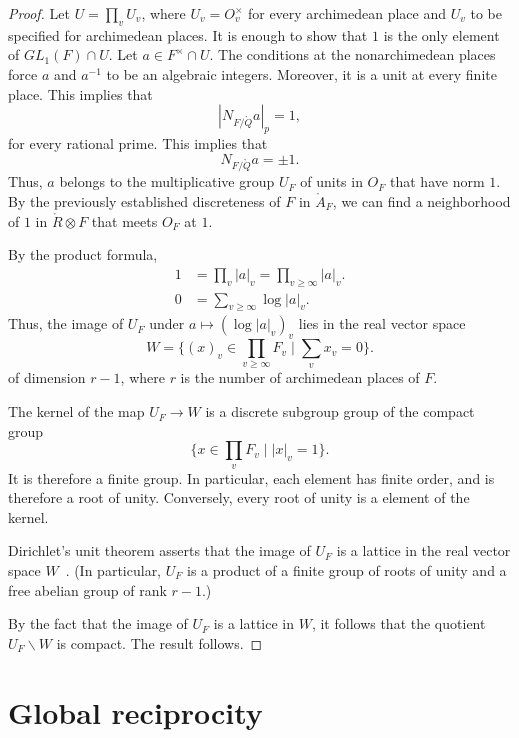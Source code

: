 \documentclass{amsart}
\def\abs#1{{|#1|}}
\def\RR{\ring{R}}
\def\AA{\ring{A}}
\begin{document}
\begin{proof} Let $U = \prod_v U_v$, where $U_v = O_v^\times$ for
  every archimedean place and $U_v$ to be specified for archimedean
  places.  It is enough to show that $1$ is the only element of
  $GL_1(F)\cap U$.  Let $a\in F^\times \cap U$.  The conditions at the
  nonarchimedean places force $a$ and $a^{-1}$ to be an algebraic integers.
  Moreover, it is a unit at every finite place.  
This implies that
\[
|N_{F/\ring{Q}} a|_p = 1,
\]
for every rational prime.  This implies that
\[
N_{F/\ring{Q}} a = \pm 1.
\]
Thus, $a$ belongs to the multiplicative group $U_F$ of units in $O_F$
that have norm $1$.  By the previously established discreteness of $F$
in $\AA_F$, we can find a neighborhood of $1$  in $\RR\otimes F$ that
meets $O_F$ at $1$.  

By the product formula,
\begin{align*}
1 &= \prod_v \abs{a}_v = \prod_{v\ge\infty} \abs{a}_v.\\
0 &= \sum_{v\ge\infty} \log \abs{a}_v.
\end{align*}
Thus, the image of $U_F$ under $a \mapsto (\log\abs{a}_v)_v$ 
lies in the real vector space
\[
W = \{ (x)_v \in \prod_{v\ge\infty} F_v \mid \sum_v x_v = 0\}.
\]
of dimension $r-1$, where $r$ is the number of archimedean places of $F$.

The kernel of the map $U_F\to W$ is a discrete subgroup group of 
the compact group 
\[
\{x\in \prod_v F_v \mid |x|_v=1\}.
\]
It is therefore a finite group.  In particular, each element has finite order,
and is therefore a root of unity.  Conversely, every root of unity is a element
of the kernel.


Dirichlet's unit theorem asserts that the image of $U_F$ is a lattice
in the real vector space $W$~\cite{XX}.  (In particular, $U_F$
is a product of a finite group of roots of unity and a free abelian
group of rank $r-1$.)


By the fact that the image of $U_F$ is a lattice in
$W$, it follows that the quotient $U_F\backslash W$ is compact.  The
result follows.
\end{proof}




\newpage
\section{Global reciprocity}
\end{document}
